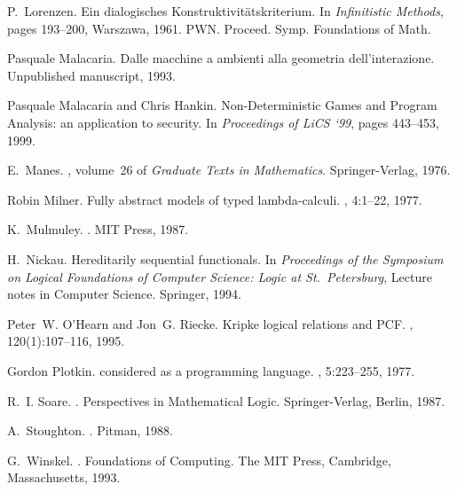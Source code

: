 \documentclass[11pt]{article}
\begin{document}
\begin{thebibliography}{Cur92b}
P.~Lorenzen.
\newblock Ein dialogisches {K}onstruktivit\"{a}tskriterium.
\newblock In {\em Infinitistic Methods}, pages 193--200, Warszawa, 1961. PWN.
\newblock Proceed. Symp. Foundations of Math.

Pasquale Malacaria.
\newblock Dalle macchine a ambienti alla geometria dell'interazione.
\newblock Unpublished manuscript, 1993.

Pasquale Malacaria and Chris Hankin.
Non-Deterministic Games and Program Analysis: an application to security.
In {\em Proceedings of LiCS `99}, pages 443--453, 1999.

E.~Manes.
, volume~26 of {\em Graduate Texts in
  Mathematics}.
\newblock Springer-Verlag, 1976.

Robin Milner.
\newblock Fully abstract models of typed lambda-calculi.
, 4:1--22, 1977.

K.~Mulmuley.
.
\newblock MIT Press, 1987.

H.~Nickau.
\newblock Hereditarily sequential functionals.
\newblock In {\em Proceedings of the Symposium on Logical Foundations of
  Computer Science: Logic at St.\ Petersburg}, Lecture notes in Computer
  Science. Springer, 1994.

Peter~W. O'Hearn and Jon~G. Riecke.
\newblock Kripke logical relations and {PCF}.
, 120(1):107--116, 1995.

Gordon Plotkin.
 considered as a programming language.
, 5:223--255, 1977.

R.~I. Soare.
.
\newblock Perspectives in Mathematical Logic. Springer-Verlag, Berlin, 1987.

A.~Stoughton.
.
\newblock Pitman, 1988.

G.~Winskel.
.
\newblock Foundations of Computing. The MIT Press, Cambridge, Massachusetts,
  1993.
\end{thebibliography}
\end{document}
